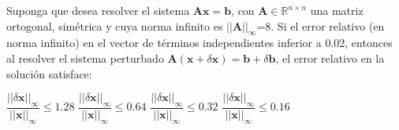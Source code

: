 \begin{pregunta}
\begin{cuerpo}


Suponga que desea resolver el sistema $\boldsymbol{Ax}=\boldsymbol{b}$, con $\boldsymbol{A}\in\mathbb{R}^{n\times n}$ una matriz ortogonal, sim\'etrica y cuya norma infinito es $||\boldsymbol{A}||_\infty$=8. Si el error relativo (en norma infinito) en el vector de t\'erminos independientes inferior a 0.02, entonces  al resolver el sistema perturbado $\boldsymbol{A}(\boldsymbol{x}+\delta\boldsymbol{x})=\boldsymbol{b}+\delta\boldsymbol{b}$, el error relativo en la soluci\'on satisface:
\end{cuerpo}
\begin{multicols}{2}
\begin{alternativas}
{$\dfrac{||\delta\boldsymbol{x}||_\infty}{||\boldsymbol{x}||_\infty}\leq 1{.}28$}
{$\dfrac{||\delta\boldsymbol{x}||_\infty}{||\boldsymbol{x}||_\infty}\leq 0{.}64$}
{$\dfrac{||\delta\boldsymbol{x}||_\infty}{||\boldsymbol{x}||_\infty}\leq 0{.}32$}
{$\dfrac{||\delta\boldsymbol{x}||_\infty}{||\boldsymbol{x}||_\infty}\leq 0{.}16$}
\end{alternativas}
\end{multicols}
\justificacion{7cm}
\end{pregunta}